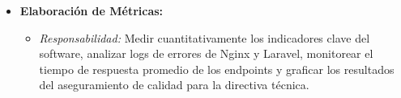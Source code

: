 \begin{itemize}
    \item \textbf{Elaboración de Métricas:}
    \begin{itemize}
        \item \textit{Responsabilidad:} Medir cuantitativamente los indicadores clave del software, analizar logs de errores de Nginx y Laravel, monitorear el tiempo de respuesta promedio de los endpoints y graficar los resultados del aseguramiento de calidad para la directiva técnica.
    \end{itemize}
\end{itemize}